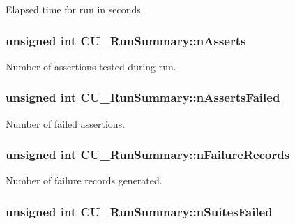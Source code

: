 Elapsed time for run in seconds. 

\hypertarget{structCU__RunSummary_a90899c9309e2b4374443a7d5ab226a90}{
\subsubsection[{n\-Asserts}]{\setlength{\rightskip}{0pt plus 5cm}unsigned int C\-U\-\_\-\-Run\-Summary\-::n\-Asserts}}\label{structCU__RunSummary_a90899c9309e2b4374443a7d5ab226a90}


Number of assertions tested during run. 

\hypertarget{structCU__RunSummary_ad5e24306584ab2f165a435b648513b9c}{
\subsubsection[{n\-Asserts\-Failed}]{\setlength{\rightskip}{0pt plus 5cm}unsigned int C\-U\-\_\-\-Run\-Summary\-::n\-Asserts\-Failed}}\label{structCU__RunSummary_ad5e24306584ab2f165a435b648513b9c}


Number of failed assertions. 

\hypertarget{structCU__RunSummary_a1a2d40200bf4a3f15fd94f4f0e1faa40}{
\subsubsection[{n\-Failure\-Records}]{\setlength{\rightskip}{0pt plus 5cm}unsigned int C\-U\-\_\-\-Run\-Summary\-::n\-Failure\-Records}}\label{structCU__RunSummary_a1a2d40200bf4a3f15fd94f4f0e1faa40}


Number of failure records generated. 

\hypertarget{structCU__RunSummary_a7ef012ea5105cd86ff16bf131f1d0ac2}{
\subsubsection[{n\-Suites\-Failed}]{\setlength{\rightskip}{0pt plus 5cm}unsigned int C\-U\-\_\-\-Run\-Summary\-::n\-Suites\-Failed}}\label{structCU__RunSummary_a7ef012ea5105cd86ff16bf131f1d0ac2}


